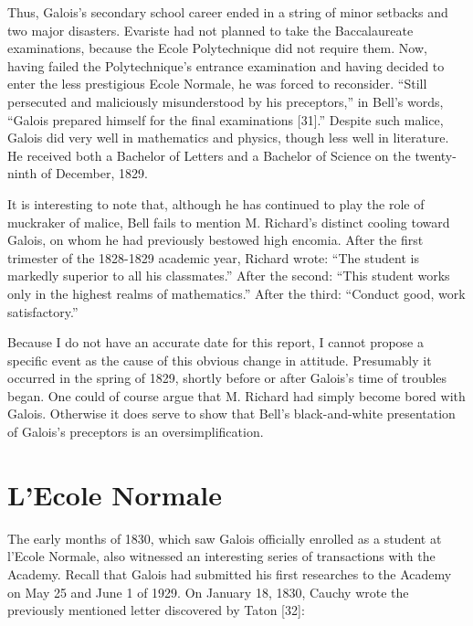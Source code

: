 \documentclass[12pt]{article}
\begin{document}
Thus, Galois's secondary school career ended in a string of minor setbacks and two major disasters. Evariste had not planned to take the Baccalaureate examinations, because the Ecole Polytechnique did not require them. Now, having failed the Polytechnique's entrance examination and having decided to enter the less prestigious Ecole Normale, he was forced to reconsider. ``Still persecuted and maliciously misunderstood by his preceptors,'' in Bell's words, ``Galois prepared himself for the final examinations [31].'' Despite such malice, Galois did very well in mathematics and physics, though less well in literature. He received both a Bachelor of Letters and a Bachelor of Science on the twenty-ninth of December, 1829.

It is interesting to note that, although he has continued to play the role of muckraker of malice, Bell fails to mention M. Richard's distinct cooling toward Galois, on whom he had previously bestowed high encomia. After the first trimester of the 1828-1829 academic year, Richard wrote: ``The student is markedly superior to all his classmates.'' After the second: ``This student works only in the highest realms of mathematics.'' After the third: ``Conduct good, work satisfactory.''

Because I do not have an accurate date for this report, I cannot propose a specific event as the cause of this obvious change in attitude. Presumably it occurred in the spring of 1829, shortly before or after Galois's time of troubles began. One could of course argue that M. Richard had simply become bored with Galois. Otherwise it does serve to show that Bell's black-and-white presentation of Galois's preceptors is an oversimplification.

\section{L'Ecole Normale}

The early months of 1830, which saw Galois officially enrolled as a student at l'Ecole Normale, also witnessed an interesting series of transactions with the Academy. Recall that Galois had submitted his first researches to the Academy on May 25 and June 1 of 1929. On January 18, 1830, Cauchy wrote the previously mentioned letter discovered by Taton [32]:
\end{document}
